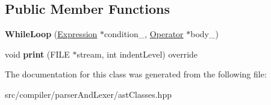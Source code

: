 \subsection*{Public Member Functions}
\begin{DoxyCompactItemize}
\item 
{\bfseries While\+Loop} (\hyperlink{classslang__AST__NODES_1_1Expression}{Expression} $\ast$condition\+\_\+, \hyperlink{classslang__AST__NODES_1_1Operator}{Operator} $\ast$body\+\_\+)\hypertarget{classslang__AST__NODES_1_1WhileLoop_ac15e8e4d71c95a9a13cfd40d3f2490c0}{}\label{classslang__AST__NODES_1_1WhileLoop_ac15e8e4d71c95a9a13cfd40d3f2490c0}

\item 
void {\bfseries print} (F\+I\+LE $\ast$stream, int indent\+Level) override\hypertarget{classslang__AST__NODES_1_1WhileLoop_ace71f78e29b6b80620d9d82b676632e8}{}\label{classslang__AST__NODES_1_1WhileLoop_ace71f78e29b6b80620d9d82b676632e8}

\end{DoxyCompactItemize}


The documentation for this class was generated from the following file\+:\begin{DoxyCompactItemize}
\item 
src/compiler/parser\+And\+Lexer/ast\+Classes.\+hpp\end{DoxyCompactItemize}
